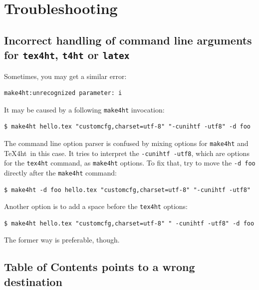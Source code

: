 \section{Troubleshooting}\label{troubleshooting}

\subsection{\texorpdfstring{Incorrect handling of command line arguments
for \texttt{tex4ht}, \texttt{t4ht} or
\texttt{latex}}{Incorrect handling of command line arguments for tex4ht, t4ht or latex}}\label{incorrect-handling-of-command-line-arguments-for-tex4ht-t4ht-or-latex}

Sometimes, you may get a similar error:

\begin{verbatim}
make4ht:unrecognized parameter: i
\end{verbatim}

It may be caused by a following \texttt{make4ht} invocation:

\begin{verbatim}
$ make4ht hello.tex "customcfg,charset=utf-8" "-cunihtf -utf8" -d foo
\end{verbatim}

The command line option parser is confused by mixing options for
\texttt{make4ht} and \TeX4ht~in this case. It tries to interpret the
\texttt{-cunihtf\ -utf8}, which are options for the \texttt{tex4ht}
command, as \texttt{make4ht} options. To fix that, try to move the
\texttt{-d\ foo} directly after the \texttt{make4ht} command:

\begin{verbatim}
$ make4ht -d foo hello.tex "customcfg,charset=utf-8" "-cunihtf -utf8"
\end{verbatim}

Another option is to add a space before the \texttt{tex4ht} options:

\begin{verbatim}
$ make4ht hello.tex "customcfg,charset=utf-8" " -cunihtf -utf8" -d foo
\end{verbatim}

The former way is preferable, though.

\subsection{Table of Contents points to a wrong
destination}\label{table-of-contents-points-to-a-wrong-destination}

